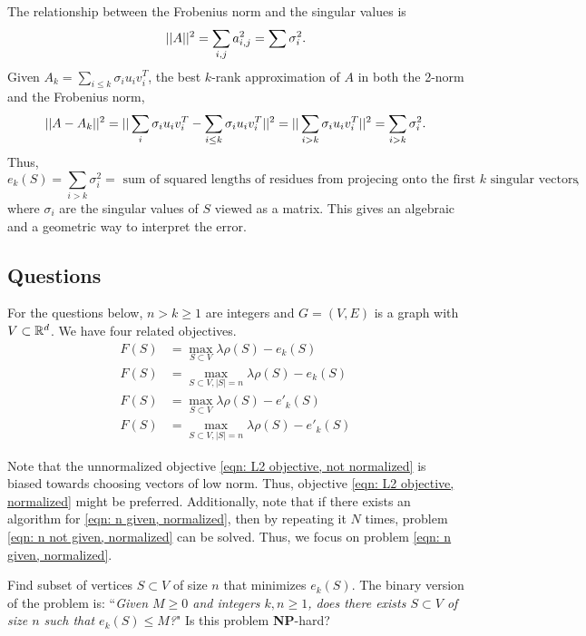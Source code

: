 \documentclass{article}
\begin{document}
The relationship between the Frobenius norm and the singular values is
$$||A||^2 = \sum_{i,j}a_{i,j}^2 = \sum \sigma_i^2.$$
Given $A_k = \sum_{i\leq k}\sigma_i u_i v_i^T$, the best $k$-rank approximation of $A$ in both the 2-norm and the Frobenius norm,
$$||A - A_k||^2 = ||\sum_{i}\sigma_i u_i v_i^T - \sum_{i\leq k}\sigma_i u_i v_i^T||^2 = ||\sum_{i > k}\sigma_i u_i v_i^T||^2 = \sum_{i>k}\sigma_i^2.$$
Thus, $$e_k(S) = \sum_{i>k}\sigma_i^2 = \text{ sum of squared lengths of residues from projecing onto the first $k$ singular vectors},$$ where $\sigma_i$ are the singular values of $S$ viewed as a matrix. This gives an algebraic and a geometric way to interpret the error.

\subsection{Questions}
For the questions below, $n > k \geq 1$ are integers and $G = (V,E)$ is a graph with $V\subset \mathbb{R}^d$. We have four related objectives.
\begin{align}
    F(S) &= \max_{S \subset V} \lambda \rho(S) - e_k(S)\label{eqn: n not given, not normalized}\\
    F(S) &= \max_{S \subset V, |S| = n} \lambda \rho(S) - e_k(S)\label{eqn: n given, not normalized}\\
    F(S) &= \max_{S \subset V} \lambda \rho(S) - e'_k(S)\label{eqn: n not given, normalized}\\
    F(S) &= \max_{S \subset V, |S| = n} \lambda \rho(S) - e'_k(S)\label{eqn: n given, normalized}
\end{align}

Note that the unnormalized objective \ref{eqn: L2 objective, not normalized} is biased towards choosing vectors of low norm. Thus, objective \ref{eqn: L2 objective, normalized} might be preferred.
 Additionally, note that if there exists an algorithm for \ref{eqn: n given, normalized}, then by repeating it $N$ times, problem \ref{eqn: n not given, normalized} can be solved. Thus, we focus on problem \ref{eqn: n given, normalized}.

\begin{question}\label{problem: no density}
    Find subset of vertices $S\subset V$ of size $n$ that minimizes $e_k(S)$. The binary version of the problem is: ``\textit{Given $M \geq 0$ and integers $k,n\geq 1$, does there exists  $S\subset V$ of size $n$ such that $e_k(S)\leq M$?}" Is this problem \textbf{NP}-hard?
\end{question}
\end{document}
